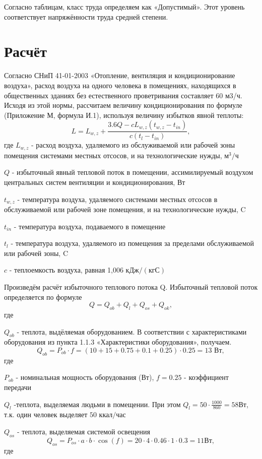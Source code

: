 Согласно таблицам, класс труда определяем как «Допустимый». Этот уровень соответ\-ствует напряжённости труда средней степени.

\section{Расчёт}

Согласно СНиП 41-01-2003 «Отопление, вентиляция и кондиционирование воздуха», расход воздуха на одного человека в помещениях, находящихся в общественных зданиях без естественного проветривания составляет 60 м3/ч. Исходя из этой нормы, рассчитаем величину кондиционирования по формуле (Приложение М, формула И.1), используя вели\-чину избытков явной теплоты:
$$
L = L_{w,z} + \frac{3.6Q - cL_{w,z}(t_{w,z} - t_{in})}{c(t_{l}-t_{in})},
$$
где
$L_{w,z}$ - расход воздуха, удаляемого из обслуживаемой или рабочей зоны помещения системами местных отсосов, и на технологические нужды,  $\mbox{м}^3/\mbox{ч}$

$Q$ - избыточный явный тепловой поток в помещении, ассимилируемый воздухом \\центральных систем вентиляции и кондиционирования, Вт

$t_{w,z}$ - температура воздуха, удаляемого системами местных отсосов в обслуживаемой или рабочей зоне помещения, и на технологические нужды, C

$t_{in}$ - температура воздуха, подаваемого в помещение

$t_{l}$ - температура воздуха, удаляемого из помещения за пределами обслуживаемой или рабочей зоны, C

$c$ - теплоемкость воздуха, равная 1,006 $\mbox{кДж}/(\mbox{кгС})$

Произведём расчёт избыточного теплового потока Q. Избыточный тепловой поток определяется по формуле
$$
Q = Q_{ob} + Q_{l} + Q_{os} + Q_{ok},
$$
где 

$Q_{ob}$ - теплота, выдёляемая оборудованием. В соответствии с характеристиками обору\-дования из пункта 1.1.3 «Характеристики оборудования», получаем.
$$
Q_{ob} = P_{ob}\cdot f = (10+15+0.75+0.1+0.25)\cdot 0.25 = 13 \mbox{ Вт},
$$
где

$P_{ob}$ - номинальная мощность оборудования (Вт), $f=0.25$ - коэффициент передачи

 $Q_{l}$ -теплота, выделяемая людьми в помещении. При этом $Q_{l} = 50\cdot \frac{1000}{860} = 58 \mbox{Вт}$, т.к. один человек выделяет $50 \mbox{ ккал/час}$

$Q_{os}$ - теплота, выделяемая системой освещения
$$
Q_{os} = P_{os} \cdot a \cdot b \cdot \cos(f) = 20 \cdot 4 \cdot 0.46 \cdot 1 \cdot 0.3 = 11 \mbox{Вт},
$$
где

